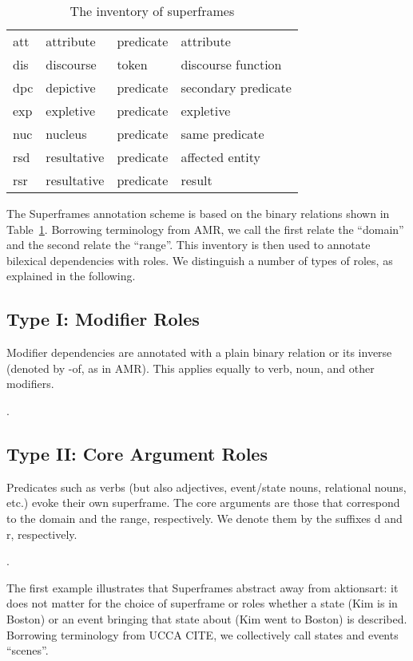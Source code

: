 \documentclass[a4paper]{article}
\begin{document}
\begin{table}
\begin{tabular}{llll}
        att & attribute & predicate & attribute \\
        dis & discourse & token & discourse function \\
        dpc & depictive & predicate & secondary predicate\\
        exp & expletive & predicate & expletive \\
        nuc & nucleus & predicate & same predicate \\
        rsd & resultative & predicate & affected entity \\
        rsr & resultative & predicate & result \\ 
        \bottomrule
    \end{tabular}
    \caption{The inventory of superframes}
    \label{tab:inventory}
\end{table}

The Superframes annotation scheme is based on the binary relations shown in Table~\ref{tab:inventory}. Borrowing terminology from AMR, we call the first relate the ``domain'' and the second relate the ``range''. This inventory is then used to annotate bilexical dependencies with roles. We distinguish a number of types of roles, as explained in the following.

\subsection{Type I: Modifier Roles}

Modifier dependencies are annotated with a plain binary relation or its inverse (denoted by \textsf{-of}, as in AMR). This applies equally to verb, noun, and other modifiers.

\ex. 

\subsection{Type II: Core Argument Roles}

Predicates such as verbs (but also adjectives, event/state nouns, relational nouns, etc.) evoke their own superframe. The core arguments are those that correspond to the domain and the range, respectively. We denote them by the suffixes \textsf{d} and \textsf{r}, respectively.

\ex. 

The first example illustrates that Superframes abstract away from aktionsart: it does not matter for the choice of superframe or roles whether a state (Kim is in Boston) or an event bringing that state about (Kim went to Boston) is described. Borrowing terminology from UCCA CITE, we collectively call states and events ``scenes''.
\end{document}
